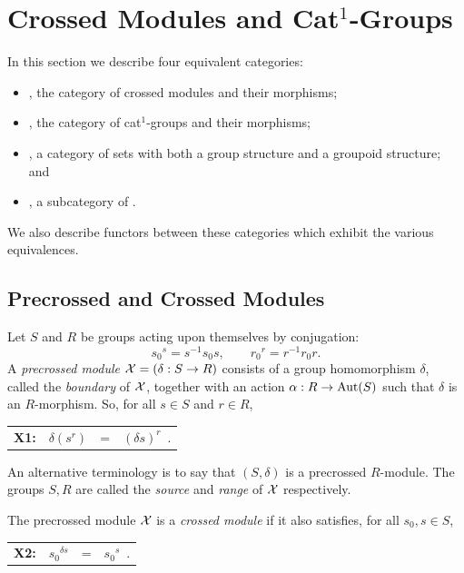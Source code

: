 
\section{Crossed Modules and Cat$^1$-Groups} \label{sect:xmod}

In this section we describe four equivalent categories:
\begin{itemize}
\item
{\catXMod}, the category of crossed modules and their morphisms;
\item
{}, the category of cat$^1$-groups and their morphisms; 
\item
{\catGpGpd}, a category of sets with both a group structure 
and a groupoid structure; and 
\item 
{\cattGp}, a subcategory of {\cattCat}.
\end{itemize}
We also describe functors between these categories which exhibit
the various equivalences.


\subsection{Precrossed and Crossed Modules}

Let $S$ and $R$ be groups acting upon themselves by conjugation:
$$
{s_0}^s = s^{-1}s_0s, \qquad {r_0}^r = r^{-1}r_0r.
$$
A \emph{precrossed module}   
$\mathcal{X} = (\delta : S \to R )$ 
consists of a group homomorphism $\delta $,  
called the \emph{boundary} of $\mathcal{X}$, 
together with an action 
$\alpha : R \to \mathrm{Aut}(S)$ such that $\delta$  is an $R$-morphism.
So, for all $s \in S$  and  $r \in R$,
\begin{center}
\begin{tabular}{c r c l }
\textbf{X1:} &  $\delta(s^r)$   &  =  &  $(\delta s)^r$~.
\end{tabular}
\end{center}
An alternative terminology is to say that  $(S,\delta)$
is a precrossed $R$-module.
  
The groups $S,R$ are called the \emph{source} and \emph{range} of $\mathcal{X}$ 
respectively. 

The precrossed module  $\mathcal{X}$  is a \emph{crossed module} 
if it also satisfies, for all  $s_0,s \in S$,
\begin{center}
\begin{tabular}{c r c l }
\textbf{X2:} &  ${s_0}^{\delta s}$  &  =  &  ${s_0}^s$~. 
\end{tabular}
\end{center}

